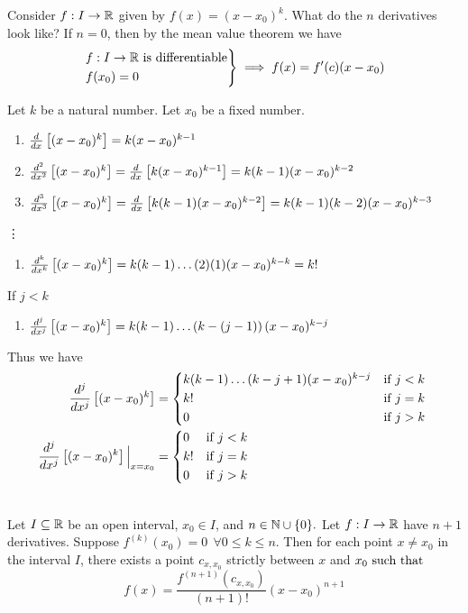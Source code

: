 Consider $f: I \to \R$ given by $f(x) = (x-x_0)^k.$ What do the $n$ derivatives look like? If $n =0$, then by the mean value theorem we have
$$
\begin{rcases*}
    f:I \to \R \text{ is differentiable} \\
    f(x_0) = 0
\end{rcases*} \implies f(x) = f'(c)(x-x_0)
$$

\begin{observation}
    Let $k$ be a natural number. Let $x_0$ be a fixed number.
    \begin{enumerate}[$*)$]
        \item $\ddx{(x-x_0)^k}{}=k(x-x_0)^{k-1}$
        \item $\ddx{(x-x_0)^k}{2} = \ddx{k(x-x_0)^{k-1}}{} = k(k-1)(x-x_0)^{k-2}$
        \item $\ddx{(x-x_0)^k}{3} = \ddx{k(k-1)(x-x_0)^{k-2}}{} = k(k-1)(k-2)(x-x_0)^{k-3}$
    \end{enumerate}
    \vdots
    \begin{enumerate}[$*)$]
        \item $\ddx{(x-x_0)^k}{k} = k(k-1)\dots(2)(1)(x-x_0)^{k-k}=k!$
    \end{enumerate}
    If $j < k$
    \begin{enumerate}[$*)$]
        \item $\ddx{(x-x_0)^k}{j}=k(k-1)\dots \left(k-(j-1)\right)(x-x_0)^{k-j}$
    \end{enumerate}
    Thus we have
    \begin{align*}
        \ddx{(x-x_0)^k}{j} &=
        \begin{cases*}
            k(k-1)\dots(k-j+1)(x-x_0)^{k-j} &if $j < k$ \\
            k! &if $j=k$ \\
            0 &if $j>k$
        \end{cases*} \\ 
        \ddx{(x-x_0)^k}{j}\Big|_{x=x_0} &=
        \begin{cases*}
            0 &if $j < k$ \\
            k! &if $j=k$ \\
            0 &if $j > k$
        \end{cases*}
    \end{align*}
\end{observation}

\begin{theorem} \leavevmode\\
    \label{Corollary of GMVT}
    Let $I\subseteq \R$ be an open interval, $x_0 \in I$, and $n \in \N \cup \{0\}.$ Let $f: I \to \R$ have $n+1$ derivatives. Suppose $f^{(k)}(x_0) = 0 ~~\forall 0 \leq k \leq n.$ Then for each point $x \not = x_0$ in the interval $I$, there exists a point $c_{x, x_0}$ strictly between $x$ and $x_0 \st$
    $$
    f(x) = \frac{f^{(n+1)}(c_{x,x_0})}{(n+1)!}(x-x_0)^{n+1}
    $$
\end{theorem}

